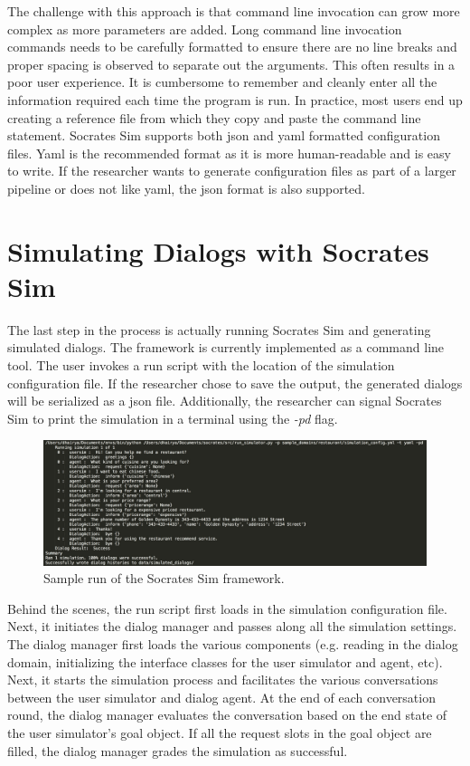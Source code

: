 The challenge with this approach is that command line invocation can grow more complex as more parameters are added. Long command line invocation commands needs to be carefully formatted to ensure there are no line breaks and proper spacing is observed to separate out the arguments. This often results in a poor user experience. It is cumbersome to remember and cleanly enter all the information required each time the program is run. In practice, most users end up creating a reference file from which they copy and paste the command line statement. Socrates Sim supports both json and yaml formatted configuration files. Yaml is the recommended format as it is more human-readable and is easy to write. If the researcher wants to generate configuration files as part of a larger pipeline or does not like yaml, the json format is also supported. 

\section{Simulating Dialogs with Socrates Sim}

The last step in the process is actually running Socrates Sim and generating simulated dialogs. The framework is currently implemented as a command line tool. The user invokes a run script with the location of the simulation configuration file. If the researcher chose to save the output, the generated dialogs will be serialized as a json file. Additionally, the researcher can signal Socrates Sim to print the simulation in a terminal using the \textit{-pd} flag. 

\begin{figure}[h!]
	\centering
	\includegraphics[scale=.15]{diagrams/sample_run.jpeg}
	\caption{ Sample run of the Socrates Sim framework. }
	\label{fig:sample_run}
\end{figure}

Behind the scenes, the run script first loads in the simulation configuration file. Next, it initiates the dialog manager and passes along all the simulation settings. The dialog manager first loads the various components (e.g. reading in the dialog domain, initializing the interface classes for the user simulator and agent, etc). Next, it starts the simulation process and facilitates the various conversations between the user simulator and dialog agent. At the end of each conversation round, the dialog manager evaluates the conversation based on the end state of the user simulator's goal object. If all the request slots in the goal object are filled, the dialog manager grades the simulation as successful. 

